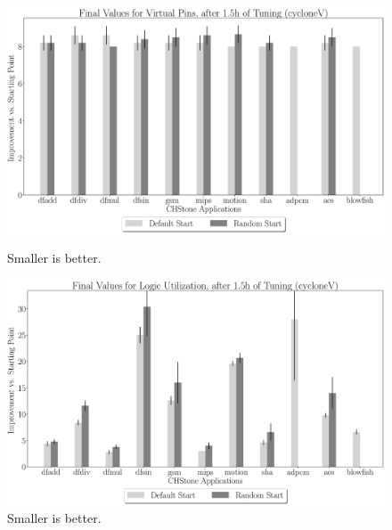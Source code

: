 \documentclass[12pt, a4paper]{article}
\begin{document}
\begin{figure}[htpb]
    \begin{minipage}{.48\textwidth}
        \centering
        \includegraphics[width=.8\textwidth]{abs_comp_pins_5400_chstone_cycloneV}
        \caption{Smaller is better.}
    \end{minipage}%
    \begin{minipage}{.48\textwidth}
        \centering
        \includegraphics[width=.8\textwidth]{abs_comp_lu_5400_chstone_cycloneV}
        \caption{Smaller is better.}
    \end{minipage}%
\end{figure}
\end{document}
